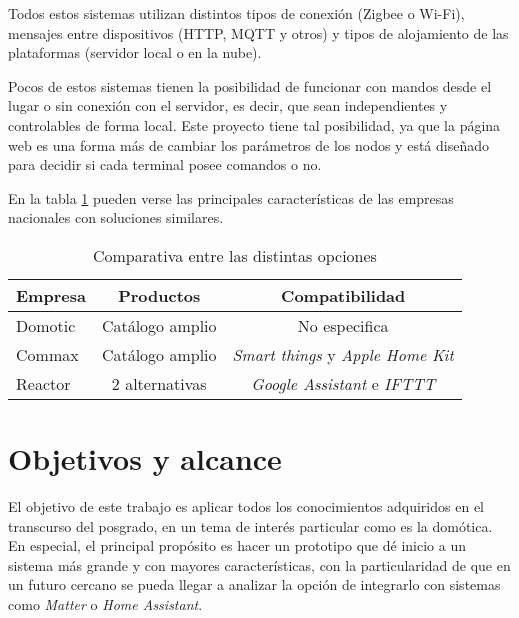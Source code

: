 Todos estos sistemas utilizan distintos tipos de conexión (Zigbee o Wi-Fi), mensajes entre dispositivos (HTTP, MQTT y otros) y tipos de alojamiento de las plataformas (servidor local o en la nube).

Pocos de estos sistemas tienen la posibilidad de funcionar con mandos desde el lugar o sin conexión con el servidor, es decir, que sean independientes y controlables de forma local. Este proyecto tiene tal posibilidad, ya que la página web es una forma más de cambiar los parámetros de los nodos y está diseñado para decidir si cada terminal posee comandos o no.

En la tabla \ref{tab:empresas} pueden verse las principales características de las empresas nacionales con soluciones similares.

\begin{table}[h]
\centering
\caption[Mercado nacional]{Comparativa entre las distintas opciones}
\begin{tabular}{l c c}
\toprule
\textbf{Empresa} & \textbf{Productos} & \textbf{Compatibilidad}\\
\midrule
Domotic	& Catálogo amplio & No especifica \\
Commax	& Catálogo amplio & \textit{Smart things} y \textit{Apple Home Kit}	\\
Reactor	& 2 alternativas & \textit{Google Assistant} e \textit{IFTTT} \\
\bottomrule
\hline
\end{tabular}
\label{tab:empresas}
\end{table}

\section{Objetivos y alcance}

El objetivo de este trabajo es aplicar todos los conocimientos adquiridos en el transcurso del posgrado, en un tema de interés particular como es la domótica. En especial, el principal propósito es hacer un prototipo que dé inicio a un sistema más grande y con mayores características, con la particularidad de que en un futuro cercano se pueda llegar a analizar la opción de integrarlo con sistemas como \textit{Matter} o \textit{Home Assistant}.

